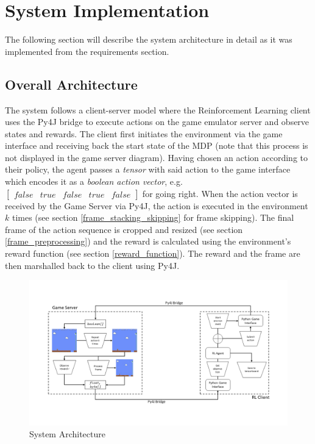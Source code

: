 \documentclass[notitlepage,a4paper,11pt]{article}
\begin{document}
	

\section{System Implementation}
The following section will describe the system architecture in detail as it was implemented from the requirements section.


\subsection{Overall Architecture}
The system follows a client-server model where the Reinforcement Learning client uses the Py4J bridge to execute actions on the game emulator server and observe states and rewards. The client first initiates the environment via the game interface and receiving back the start state of the MDP (note that this process is not displayed in the game server diagram). Having chosen an action according to their policy, the agent passes a \textit{tensor} with said action to the game interface which encodes it as a \textit{boolean action vector}, e.g. $\begin{bmatrix} false & true & false & true & false\end{bmatrix}$ for going right. When the action vector is received by the Game Server via Py4J, the action is executed in the environment $k$ times (see section \ref{frame_stacking_skipping} for frame skipping). The final frame of the action sequence is cropped and resized (see section \ref{frame_preprocessing}) and the reward is calculated using the environment's reward function (see section \ref{reward_function}). The reward and the frame are then marshalled back to the client using Py4J.

\begin{figure}[!htb]
\centering
\includegraphics[trim={0 2cm 0 2cm},clip,width=1\linewidth]{figs/system_architecture.png}
\caption{System Architecture}
\end{figure}
\end{document}
